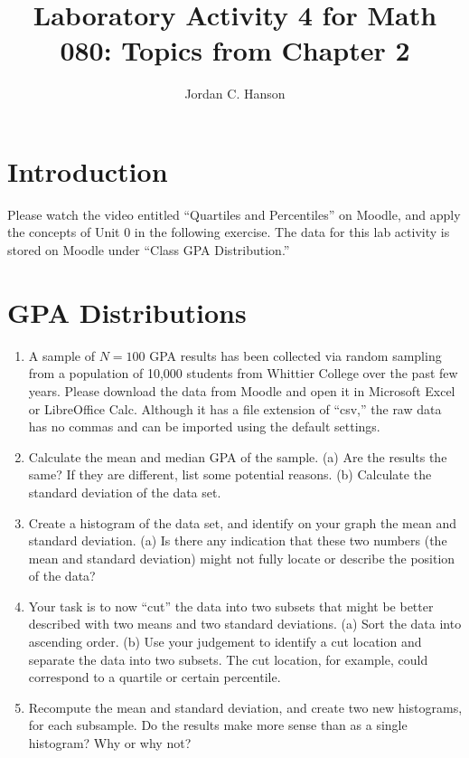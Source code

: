 \documentclass{article}
\begin{document}
\title{Laboratory Activity 4 for Math 080: Topics from Chapter 2}
\author{Jordan C. Hanson}
\maketitle

\section{Introduction}

Please watch the video entitled ``Quartiles and Percentiles'' on Moodle, and apply the concepts of Unit 0 in the following exercise.  The data for this lab activity is stored on Moodle under ``Class GPA Distribution.''

\section{GPA Distributions}

\begin{enumerate}
\item A sample of $N = 100$ GPA results has been collected via random sampling from a population of 10,000 students from Whittier College over the past few years.  Please download the data from Moodle and open it in Microsoft Excel or LibreOffice Calc.  Although it has a file extension of ``csv,'' the raw data has no commas and can be imported using the default settings.
\item Calculate the mean and median GPA of the sample. (a) Are the results the same?  If they are different, list some potential reasons. (b) Calculate the standard deviation of the data set.
\item Create a histogram of the data set, and identify on your graph the mean and standard deviation.  (a) Is there any indication that these two numbers (the mean and standard deviation) might not fully locate or describe the position of the data?
\item Your task is to now ``cut'' the data into two subsets that might be better described with two means and two standard deviations.  (a) Sort the data into ascending order.  (b) Use your judgement to identify a cut location and separate the data into two subsets.  The cut location, for example, could correspond to a quartile or certain percentile.
\item Recompute the mean and standard deviation, and create two new histograms, for each subsample.  Do the results make more sense than as a single histogram?  Why or why not?
\end{enumerate}
\end{document}
